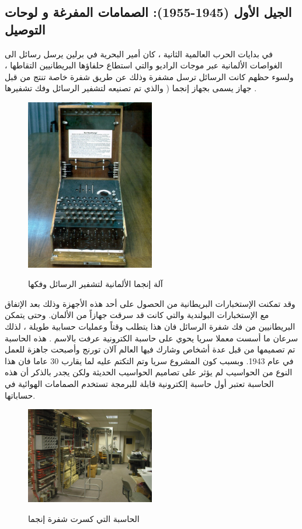 \documentclass[document.tex]{subfiles}
\begin{document}
\subsection{الجيل الأول (1945-1955): الصمامات المفرغة و لوحات التوصيل}
في بدايات الحرب العالمية الثانية ، كان أمير البحرية في برلين يرسل رسائل الى الغواصات الألمانية عبر موجات الراديو والتي استطاع حلفاؤها البريطانيين التقاطها ، ولسوء حظهم كانت الرسائل ترسل مشفرة وذلك عن طريق شفرة خاصة تنتج من قبل جهاز يسمى بجهاز إنجما ( والذي تم تصنيعه لتشفير الرسائل وفك تشفيرها .
\begin{figure}[h!] 
  \caption{آلة إنجما الألمانية لتشفير الرسائل وفكها}
  \centering
   \includegraphics[width=0.5\textwidth]{../img/Enigma}
 \label{fig:Enigma} 
\end{figure}
 وقد تمكنت الإستخبارات البريطانية من الحصول على أحد هذه الأجهزة وذلك بعد الإتفاق مع الإستخبارات البولندية والتي كانت قد سرقت جهازاً من الألمان.  وحتى يتمكن البريطانيين من فك شفرة الرسائل فان هذا يتطلب وقتاً وعمليات حسابية طويلة ، لذلك سرعان ما أسست معملا سريا يحوي على حاسبة الكترونية عرفت بالاسم . هذه الحاسبة تم تصميمها من قبل عدة أشخاص وشارك فيها العالم آلان تورنج وأصبحت جاهزة للعمل في عام 1943.  وبسبب كون المشروع سريا وتم التكتم عليه لما يقارب 30 عاما فان هذا النوع من الحواسيب لم يؤثر على تصاميم الحواسيب الحديثة ولكن يجدر بالذكر أن هذه الحاسبة تعتبر أول حاسبة إلكترونية قابلة للبرمجة تستخدم الصمامات الهوائية في حساباتها. 

\begin{figure}[h!] 
  \caption{الحاسبة  التي كسرت شفرة إنجما}
  \centering
   \includegraphics[width=0.5\textwidth]{../img/colossus}
 \label{fig:colossus} 
\end{figure}
\end{document}

